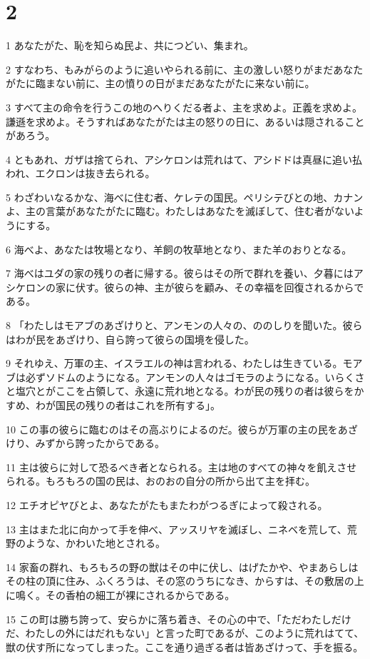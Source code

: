 \chapter{2}

\par 1 あなたがた、恥を知らぬ民よ、共につどい、集まれ。
\par 2 すなわち、もみがらのように追いやられる前に、主の激しい怒りがまだあなたがたに臨まない前に、主の憤りの日がまだあなたがたに来ない前に。
\par 3 すべて主の命令を行うこの地のへりくだる者よ、主を求めよ。正義を求めよ。謙遜を求めよ。そうすればあなたがたは主の怒りの日に、あるいは隠されることがあろう。
\par 4 ともあれ、ガザは捨てられ、アシケロンは荒れはて、アシドドは真昼に追い払われ、エクロンは抜き去られる。
\par 5 わざわいなるかな、海べに住む者、ケレテの国民。ペリシテびとの地、カナンよ、主の言葉があなたがたに臨む。わたしはあなたを滅ぼして、住む者がないようにする。
\par 6 海べよ、あなたは牧場となり、羊飼の牧草地となり、また羊のおりとなる。
\par 7 海べはユダの家の残りの者に帰する。彼らはその所で群れを養い、夕暮にはアシケロンの家に伏す。彼らの神、主が彼らを顧み、その幸福を回復されるからである。
\par 8 「わたしはモアブのあざけりと、アンモンの人々の、ののしりを聞いた。彼らはわが民をあざけり、自ら誇って彼らの国境を侵した。
\par 9 それゆえ、万軍の主、イスラエルの神は言われる、わたしは生きている。モアブは必ずソドムのようになる。アンモンの人々はゴモラのようになる。いらくさと塩穴とがここを占領して、永遠に荒れ地となる。わが民の残りの者は彼らをかすめ、わが国民の残りの者はこれを所有する」。
\par 10 この事の彼らに臨むのはその高ぶりによるのだ。彼らが万軍の主の民をあざけり、みずから誇ったからである。
\par 11 主は彼らに対して恐るべき者となられる。主は地のすべての神々を飢えさせられる。もろもろの国の民は、おのおの自分の所から出て主を拝む。
\par 12 エチオピヤびとよ、あなたがたもまたわがつるぎによって殺される。
\par 13 主はまた北に向かって手を伸べ、アッスリヤを滅ぼし、ニネベを荒して、荒野のような、かわいた地とされる。
\par 14 家畜の群れ、もろもろの野の獣はその中に伏し、はげたかや、やまあらしはその柱の頂に住み、ふくろうは、その窓のうちになき、からすは、その敷居の上に鳴く。その香柏の細工が裸にされるからである。
\par 15 この町は勝ち誇って、安らかに落ち着き、その心の中で、「ただわたしだけだ、わたしの外にはだれもない」と言った町であるが、このように荒れはてて、獣の伏す所になってしまった。ここを通り過ぎる者は皆あざけって、手を振る。

